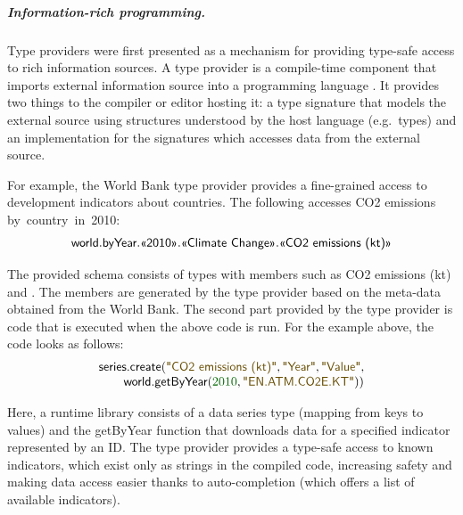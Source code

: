 \documentclass[a4paper,UKenglish]{lipics-v2016}
\theoremstyle{plain}
\theoremstyle{definition}
\newcommand{\num}[1]{\textcolor{numclr}{#1}}
\newcommand{\str}[1]{\textnormal{\textcolor{strclr}{\sffamily "#1"}}}
\newcommand{\ident}[1]{\textnormal{\sffamily #1}}
\newcommand{\qident}[1]{\textnormal{\sffamily \guillemotleft #1\guillemotright}}
\begin{document}
\subparagraph{Information-rich programming.} Type providers were first presented as a mechanism
for providing type-safe access to rich information sources. A type provider is a compile-time 
component that imports external information source into a programming language \cite{inforich}. It provides two 
things to the compiler or editor hosting it: a type signature that models the external source 
using structures understood by the host language (e.g.~types) and an implementation for the 
signatures which accesses data from the external source.

For example, the World Bank type provider \cite{ageweb} provides a fine-grained access to development 
indicators about countries. The following accesses CO2 emissions by~country~in~2010:
%
\begin{equation*}
\begin{array}{l}
\ident{world}.\ident{byYear}.\qident{2010}.\qident{Climate Change}.\qident{CO2 emissions (kt)}
\end{array}
\end{equation*}

\noindent
The provided schema consists of types with members such as \qident{CO2 emissions (kt)} and \qident{2010}.
The members are generated by the type provider based on the meta-data obtained from the World Bank.
The second part provided by the type provider is code that is executed when the above code is run.
For the example above, the code looks as follows:
%
\begin{equation*}
\begin{array}{l}
\ident{series.create}(\str{CO2 emissions (kt)},\str{Year},\str{Value},\\
\qquad \ident{world.getByYear}(\num{2010},\str{EN.ATM.CO2E.KT}))
\end{array}
\end{equation*}

\noindent
Here, a runtime library consists of a data series type (mapping from keys to values) and the 
\ident{getByYear} function that downloads data for a specified indicator represented by an ID. 
The type provider provides a type-safe access to known indicators, which exist only as strings in 
the compiled code, increasing safety and making data access easier thanks to auto-completion 
(which offers a list of available indicators).
\end{document}
